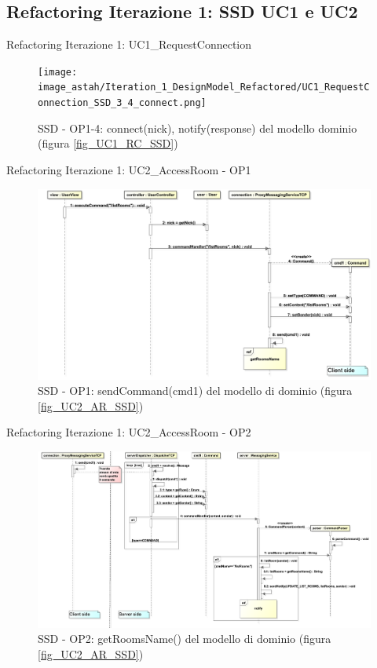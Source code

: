 \subsection{Refactoring Iterazione 1: SSD UC1 e UC2}
\begin{frame} {Refactoring Iterazione 1: UC1\_RequestConnection}
   \begin{figure}
     \texttt{[image: image\_astah/Iteration\_1\_DesignModel\_Refactored/UC1\_RequestConnection\_SSD\_3\_4\_connect.png]}{\centering}
     \caption{SSD - OP1-4: connect(nick), notify(response) del modello dominio (figura \ref{fig_UC1_RC_SSD}) }
     \label{fig_UC1_SSDR_RC_1_4} 
   \end{figure}
\end{frame}

\begin{frame} {Refactoring Iterazione 1: UC2\_AccessRoom - OP1}
   \begin{figure}
     \includegraphics[scale=0.16]{image_astah/Iteration_1_DesignModel_Refactored/UC2_AccessRoom_SSD_1_sendCommand.png}{\centering}
     \caption{SSD - OP1: sendCommand(cmd1) del modello di dominio (figura \ref{fig_UC2_AR_SSD}) }
     \label{fig_UC2_SSDR_AC_1} 
   \end{figure}
\end{frame}

\begin{frame} {Refactoring Iterazione 1: UC2\_AccessRoom - OP2}
   \begin{figure}
     \includegraphics[scale=0.135]{image_astah/Iteration_1_DesignModel_Refactored/UC2_AccessRoom_SSD_2_getRoomsName.png}{\centering}
     \caption{SSD - OP2: getRoomsName() del modello di dominio (figura \ref{fig_UC2_AR_SSD}) }
     \label{fig_UC2_SSDR_AC_2} 
   \end{figure}
\end{frame}

